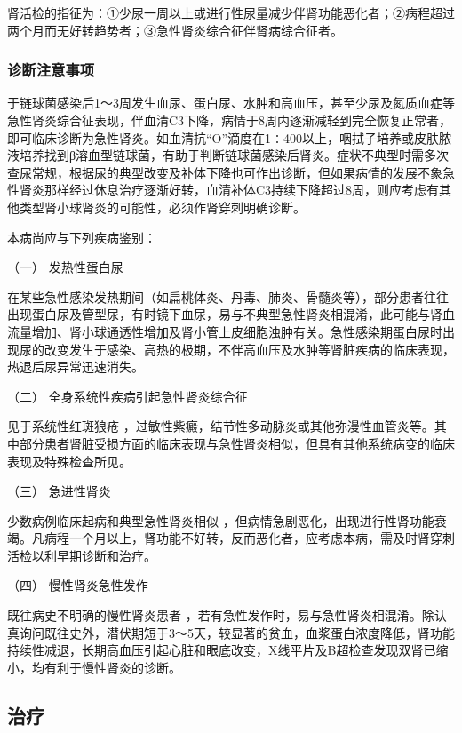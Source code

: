 肾活检的指征为：①少尿一周以上或进行性尿量减少伴肾功能恶化者；②病程超过两个月而无好转趋势者；③急性肾炎综合征伴肾病综合征者。

\subsubsection{诊断注意事项}

于链球菌感染后1～3周发生血尿、蛋白尿、水肿和高血压，甚至少尿及氮质血症等急性肾炎综合征表现，伴血清C3下降，病情于8周内逐渐减轻到完全恢复正常者，即可临床诊断为急性肾炎。如血清抗“O”滴度在1∶400以上，咽拭子培养或皮肤脓液培养找到β溶血型链球菌，有助于判断链球菌感染后肾炎。症状不典型时需多次查尿常规，根据尿的典型改变及补体下降也可作出诊断，但如果病情的发展不象急性肾炎那样经过休息治疗逐渐好转，血清补体C3持续下降超过8周，则应考虑有其他类型肾小球肾炎的可能性，必须作肾穿刺明确诊断。

本病尚应与下列疾病鉴别：

\hypertarget{text00338.htmlux5cux23CHP13-1-2-3-1}{}
（一） 发热性蛋白尿

在某些急性感染发热期间（如扁桃体炎、丹毒、肺炎、骨髓炎等），部分患者往往出现蛋白尿及管型尿，有时镜下血尿，易与不典型急性肾炎相混淆，此可能与肾血流量增加、肾小球通透性增加及肾小管上皮细胞浊肿有关。急性感染期蛋白尿时出现尿的改变发生于感染、高热的极期，不伴高血压及水肿等肾脏疾病的临床表现，热退后尿异常迅速消失。

\hypertarget{text00338.htmlux5cux23CHP13-1-2-3-2}{}
（二） 全身系统性疾病引起急性肾炎综合征

见于系统性红斑狼疮
，过敏性紫癜，结节性多动脉炎或其他弥漫性血管炎等。其中部分患者肾脏受损方面的临床表现与急性肾炎相似，但具有其他系统病变的临床表现及特殊检查所见。

\hypertarget{text00338.htmlux5cux23CHP13-1-2-3-3}{}
（三） 急进性肾炎

少数病例临床起病和典型急性肾炎相似
，但病情急剧恶化，出现进行性肾功能衰竭。凡病程一个月以上，肾功能不好转，反而恶化者，应考虑本病，需及时肾穿刺活检以利早期诊断和治疗。

\hypertarget{text00338.htmlux5cux23CHP13-1-2-3-4}{}
（四） 慢性肾炎急性发作

既往病史不明确的慢性肾炎患者
，若有急性发作时，易与急性肾炎相混淆。除认真询问既往史外，潜伏期短于3～5天，较显著的贫血，血浆蛋白浓度降低，肾功能持续性减退，长期高血压引起心脏和眼底改变，X线平片及B超检查发现双肾已缩小，均有利于慢性肾炎的诊断。

\subsection{治疗}

